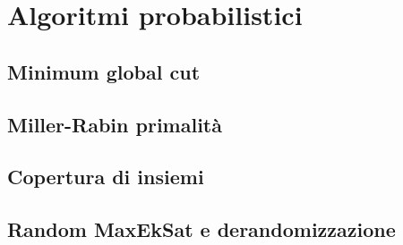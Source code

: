 \section{Algoritmi probabilistici}
\subsection{Minimum global cut}
\subsection{Miller-Rabin primalità}
\subsection{Copertura di insiemi}
\subsection{Random MaxEkSat e derandomizzazione}
